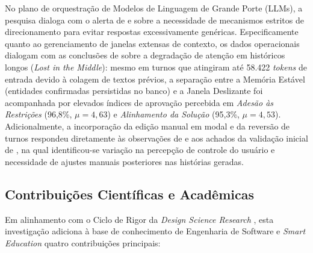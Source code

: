 No plano de orquestração de Modelos de Linguagem de Grande Porte (LLMs), a pesquisa dialoga com o alerta de  e  sobre a necessidade de mecanismos estritos de direcionamento para evitar respostas excessivamente genéricas. Especificamente quanto ao gerenciamento de janelas extensas de contexto, os dados operacionais dialogam com as conclusões de  sobre a degradação de atenção em históricos longos (\textit{Lost in the Middle}): mesmo em turnos que atingiram até 58.422 \textit{tokens} de entrada devido à colagem de textos prévios, a separação entre a Memória Estável (entidades confirmadas persistidas no banco) e a Janela Deslizante foi acompanhada por elevados índices de aprovação percebida em \textit{Adesão às Restrições} (96,8\%, $\mu = 4,63$) e \textit{Alinhamento da Solução} (95,3\%, $\mu = 4,53$). Adicionalmente, a incorporação da edição manual em modal e da reversão de turnos respondeu diretamente às observações de  e aos achados da validação inicial de , na qual identificou-se variação na percepção de controle do usuário e necessidade de ajustes manuais posteriores nas histórias geradas.

\subsection{Contribuições Científicas e Acadêmicas}

Em alinhamento com o Ciclo de Rigor da \textit{Design Science Research} \cite{hevner2004, hevner2007}, esta investigação adiciona à base de conhecimento de Engenharia de Software e \textit{Smart Education} quatro contribuições principais:


